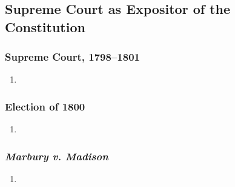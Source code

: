 \subsection{Supreme Court as Expositor of the Constitution}

\subsubsection{Supreme Court, 1798--1801}

\begin{enumerate}
    \item %
\end{enumerate}

\subsubsection{Election of 1800}

\begin{enumerate}
    \item %
\end{enumerate}

\subsubsection{\emph{Marbury v. Madison}}

\begin{enumerate}
    \item %
\end{enumerate}

% 
% 
% 
% 
% 
% 
% 
% 

